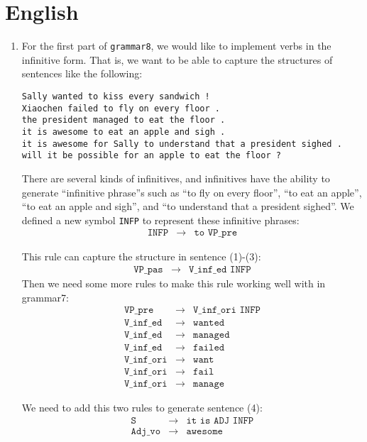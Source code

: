 \documentclass[11pt]{article}
\newcommand{\code}[1]{\texttt{#1}}
\begin{document}
\section{English}
\begin{enumerate}
\item For the first part of \code{grammar8}, we would like to implement verbs in the infinitive form. That is, we want to be able to capture the structures of sentences like the following:
\begin{lstlisting}
Sally wanted to kiss every sandwich !               
Xiaochen failed to fly on every floor .             
the president managed to eat the floor .            
it is awesome to eat an apple and sigh .            
it is awesome for Sally to understand that a president sighed .
will it be possible for an apple to eat the floor ? 
\end{lstlisting}

There are several kinds of infinitives, and infinitives have the ability to generate ``infinitive phrase''s such as ``to fly on every floor'', ``to eat an apple'', ``to eat an apple and sigh'', and ``to understand that a president sighed''. We defined a new symbol \code{INFP} to represent these infinitive phrases:
\begin{eqnarray*}
	\code{INFP} &\to& \code{to VP\_pre}
\end{eqnarray*}

This rule can capture the structure in sentence (1)-(3):
\begin{eqnarray*}
	\code{VP\_pas} &\to& \code{V\_inf\_ed INFP}
\end{eqnarray*}
Then we need some more rules to make this rule working well with in grammar7:
\begin{eqnarray*}
\code{VP\_pre} &\to& \code{V\_inf\_ori INFP}\\
\code{V\_inf\_ed} &\to& \code{wanted}\\
\code{V\_inf\_ed} &\to& \code{managed}\\
\code{V\_inf\_ed} &\to& \code{failed}\\
\code{V\_inf\_ori} &\to& \code{want}\\
\code{V\_inf\_ori} &\to& \code{fail}\\
\code{V\_inf\_ori} &\to& \code{manage}
\end{eqnarray*}

We need to add this two rules to generate sentence (4):
\begin{eqnarray*}
\code{S} &\to& \code{it is ADJ INFP}\\
\code{Adj\_vo} &\to& \code{awesome}
\end{eqnarray*}


\end{enumerate}
\end{document}
